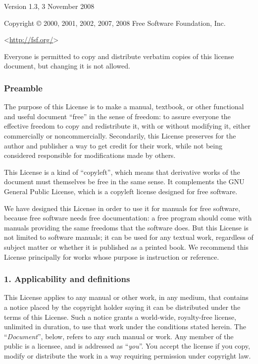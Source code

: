 \documentclass[a4paper,openany]{book}
\begin{document}
 Version 1.3, 3 November 2008


 Copyright \copyright{} 2000, 2001, 2002, 2007, 2008 Free Software Foundation, Inc.

 \bigskip

 <\url{http://fsf.org/}>

 \bigskip

 Everyone is permitted to copy and distribute verbatim copies
 of this license document, but changing it is not allowed.

\begin{results}
\tiny

\subsubsection*{Preamble}

The purpose of this License is to make a manual, textbook, or other
functional and useful document ``free'' in the sense of freedom: to
assure everyone the effective freedom to copy and redistribute it,
with or without modifying it, either commercially or noncommercially.
Secondarily, this License preserves for the author and publisher a way
to get credit for their work, while not being considered responsible
for modifications made by others.

This License is a kind of ``copyleft'', which means that derivative
works of the document must themselves be free in the same sense. It
complements the GNU General Public License, which is a copyleft
license designed for free software.

We have designed this License in order to use it for manuals for free
software, because free software needs free documentation: a free
program should come with manuals providing the same freedoms that the
software does. But this License is not limited to software manuals;
it can be used for any textual work, regardless of subject matter or
whether it is published as a printed book. We recommend this License
principally for works whose purpose is instruction or reference.

\subsubsection*{1. Applicability and definitions}

This License applies to any manual or other work, in any medium, that
contains a notice placed by the copyright holder saying it can be
distributed under the terms of this License. Such a notice grants a
world-wide, royalty-free license, unlimited in duration, to use that
work under the conditions stated herein. The ``\emph{Document}'', below,
refers to any such manual or work. Any member of the public is a
licensee, and is addressed as ``\emph{you}''. You accept the license if you
copy, modify or distribute the work in a way requiring permission
under copyright law.


\end{results}
\end{document}
